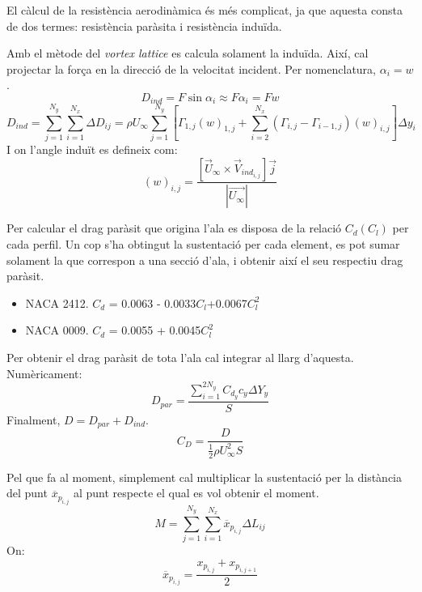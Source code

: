 El càlcul de la resistència aerodinàmica és més complicat, ja que aquesta consta de dos termes: resistència paràsita i resistència induïda.

Amb el mètode del \textit{vortex lattice} es calcula solament la induïda. Així, cal projectar la força en la direcció de la velocitat incident. Per nomenclatura, $\alpha_i = w $.
\begin{equation}
D_{ind}=F\sin{\alpha_i} \approx F\alpha_i = Fw
\end{equation}
\begin{equation}
D_{ind} = \sum_{j=1}^{N_{y}}\sum_{i=1}^{N_{x}}\Delta D_{ij}=\rho U_{\infty}\sum_{j=1}^{N_{y}}\left[\Gamma_{1,j}(w)_{1,j}+\sum_{i=2}^{N_{x}}\left(\Gamma_{i,j}-\Gamma_{i-1,j}\right)(w)_{i,j}\right]\Delta y_{i}
\end{equation}
I on l'angle induït es defineix com:
\begin{equation}
(w)_{i,j}=\frac{\left[\vec{U}_{\infty} \times \vec{V}_{ind_{i,j}}\right]\vec{j}}{|\vec{U_{\infty}}|}
\end{equation}

Per calcular el drag paràsit que origina l'ala es disposa de la relació $C_d(C_l)$ per cada perfil. Un cop s'ha obtingut la sustentació per cada element, es pot sumar solament la que correspon a una secció d'ala, i obtenir així el seu respectiu drag paràsit.
\begin{itemize}
	\item NACA 2412. $C_d$ = 0.0063 - 0.0033$C_l$+0.0067$C_{l}^2$
	\item NACA 0009. $C_d$ = 0.0055 + 0.0045$C_{l}^2$
\end{itemize}
Per obtenir el drag paràsit de tota l'ala cal integrar al llarg d'aquesta. Numèricament:
\begin{equation}
D_{par}=\frac{\sum_{i=1}^{2N_{y}}C_{d_y}c_y\Delta Y_y}{S}
\end{equation}
Finalment, $ D = D_{par} + D_{ind}$.
\begin{equation}
C_{D}=\frac{D}{\frac{1}{2}\rho U_{\infty}^{2}S}
\end{equation}

Pel que fa al moment, simplement cal multiplicar la sustentació per la distància del punt $\overline{x}_{p_{i,j}}$ al punt respecte el qual es vol obtenir el moment.
\begin{equation}
M = \sum_{j=1}^{N_{y}}\sum_{i=1}^{N_{x}}\overline{x}_{p_{i,j}}\Delta L_{ij}
\end{equation}
On:
\begin{equation}
\overline{x}_{p_{i,j}} = \frac{x_{p_{i,j}} + x_{p_{i,j+1}} }{2}
\end{equation}
